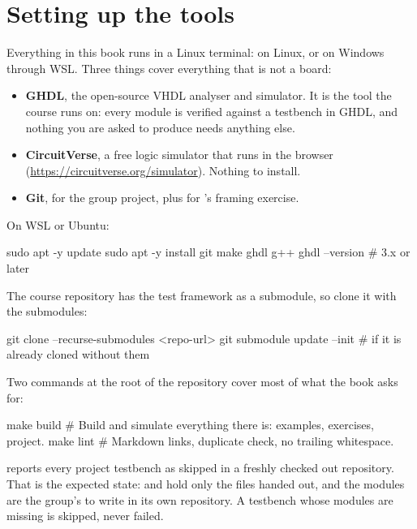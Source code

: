 \section*{Setting up the tools}
Everything in this book runs in a Linux terminal: on Linux, or on Windows through WSL. Three
things cover everything that is not a board:

\begin{itemize}
  \item \textbf{GHDL}, the open-source VHDL analyser and simulator. It is the tool the course runs
    on: every module is verified against a testbench in GHDL, and nothing you are asked to produce
    needs anything else.
  \item \textbf{CircuitVerse}, a free logic simulator that runs in the browser
    (\url{https://circuitverse.org/simulator}). Nothing to install.
  \item \textbf{Git}, for the group project, plus  for 's framing
    exercise.
\end{itemize}

\noindent On WSL or Ubuntu:

\begin{shell}
sudo apt -y update
sudo apt -y install git make ghdl g++
ghdl --version           # 3.x or later
\end{shell}

\noindent The course repository has the test framework as a submodule, so clone it with the
submodules:

\begin{shell}
git clone --recurse-submodules <repo-url>
git submodule update --init       # if it is already cloned without them
\end{shell}

\noindent Two commands at the root of the repository cover most of what the book asks for:

\begin{shell}
make build               # Build and simulate everything there is: examples, exercises, project.
make lint                # Markdown links, duplicate check, no trailing whitespace.
\end{shell}

\noindent{} reports every project testbench as skipped in a freshly checked
out repository. That is the expected state:  and  hold only the
files handed out, and the modules are the group's to write in its own repository. A testbench
whose modules are missing is skipped, never failed.

